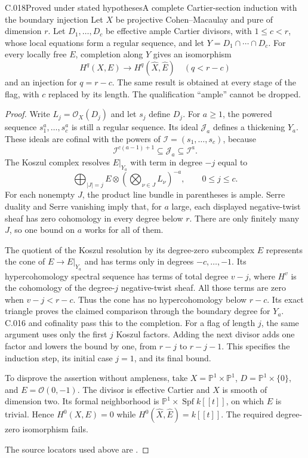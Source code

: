 \begin{saresult}{C.018}{Proved under stated hypotheses}{A complete Cartier-section induction with the boundary injection}
Let $X$ be projective Cohen--Macaulay and pure of dimension $r$.
Let $D_1,\ldots,D_c$ be effective ample Cartier divisors, with
$1\leq c<r$, whose local equations form a regular sequence, and let
$Y=D_1\cap\cdots\cap D_c$. For every locally free $E$, completion
along $Y$ gives an isomorphism
\[
 H^q(X,E)\longrightarrow H^q(\widehat X,\widehat E)
       \quad(q<r-c)
\]
and an injection for $q=r-c$.
The same result is obtained at every stage of the flag, with $c$
replaced by its length. The qualification ``ample'' cannot be dropped.
\end{saresult}
\begin{proof}
Write $L_j=\mathcal O_X(D_j)$ and let $s_j$ define $D_j$.
For $a\geq1$, the powered sequence $s_1^a,\ldots,s_c^a$ is still a
regular sequence. Its ideal $\mathcal J_a$ defines a thickening $Y_a$.
These ideals are cofinal with the powers of
$\mathcal I=(s_1,\ldots,s_c)$, because
\[
 \mathcal I^{c(a-1)+1}\subseteq\mathcal J_a\subseteq\mathcal I^a.
\]
The Koszul complex resolves $E|_{Y_a}$ with term in degree $-j$
equal to
\[
 \bigoplus_{|J|=j} E\otimes
       \left(\bigotimes_{\nu\in J}L_\nu\right)^{-a},
       \qquad 0\leq j\leq c.
\]
For each nonempty $J$, the product line bundle in parentheses is
ample. Serre duality and Serre vanishing imply that, for $a$ large,
each displayed negative-twist sheaf has zero cohomology in every
degree below $r$. There are only finitely many $J$, so one bound on
$a$ works for all of them.

The quotient of the Koszul resolution by its degree-zero subcomplex
$E$ represents the cone of $E\to E|_{Y_a}$ and has terms only in
degrees $-c,\ldots,-1$. Its hypercohomology spectral sequence has
terms of total degree $v-j$, where $H^v$ is the cohomology of the
degree-$j$ negative-twist sheaf. All those terms are zero when
$v-j<r-c$. Thus the cone has no hypercohomology below $r-c$.
Its exact triangle proves the claimed comparison through the boundary
degree for $Y_a$. C.016 and cofinality pass this to the completion.
For a flag of length $j$, the same argument uses only the first $j$
Koszul factors. Adding the next divisor adds one factor and lowers
the bound by one, from $r-j$ to $r-j-1$. This specifies the induction
step, its initial case $j=1$, and its final bound.

To disprove the assertion without ampleness, take
$X=\mathbb P^1\times\mathbb P^1$, $D=\mathbb P^1\times\{0\}$,
and $E=\mathcal O(0,-1)$. The divisor is effective Cartier and
$X$ is smooth of dimension two. Its formal neighborhood is
$\mathbb P^1\times\operatorname{Spf}k[[t]]$, on which $E$ is
trivial. Hence $H^0(X,E)=0$ while
$H^0(\widehat X,\widehat E)=k[[t]]$. The required degree-zero
isomorphism fails.

The source locators used above are \cite[XII, 2.1--2.3, pp.~114--115]{C-sga2}.
\end{proof}


